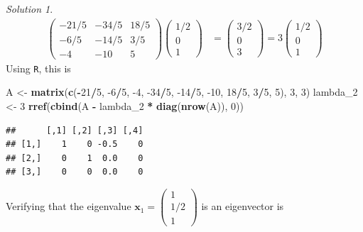 \documentclass[
]{book}
\newenvironment{Shaded}{\begin{snugshade}}{\end{snugshade}}
\newcommand{\DecValTok}[1]{\textcolor[rgb]{0.00,0.00,0.81}{#1}}
\newcommand{\KeywordTok}[1]{\textcolor[rgb]{0.13,0.29,0.53}{\textbf{#1}}}
\newcommand{\NormalTok}[1]{#1}
\newcommand{\OperatorTok}[1]{\textcolor[rgb]{0.81,0.36,0.00}{\textbf{#1}}}
\newcommand{\StringTok}[1]{\textcolor[rgb]{0.31,0.60,0.02}{#1}}
\theoremstyle{definition}
\theoremstyle{definition}
\theoremstyle{definition}
\theoremstyle{definition}
\theoremstyle{remark}
\newtheorem*{solution}{Solution}
\begin{document}
\begin{solution}
\[\begin{aligned}
\begin{pmatrix} -21/5 & -34/5 & 18/5 \\ -6/5 & -14/5 & 3/5 \\ -4 & -10 & 5 \end{pmatrix} \begin{pmatrix} 1/2 \\ 0 \\ 1 \end{pmatrix} & = \begin{pmatrix} 3/2 \\ 0 \\ 3 \end{pmatrix}  = 3 \begin{pmatrix} 1/2 \\ 0 \\ 1 \end{pmatrix}
\end{aligned}
\]
Using \texttt{R}, this is

\begin{Shaded}
\begin{Highlighting}[]
\NormalTok{A <-}\StringTok{ }\KeywordTok{matrix}\NormalTok{(}\KeywordTok{c}\NormalTok{(}\OperatorTok{-}\DecValTok{21}\OperatorTok{/}\DecValTok{5}\NormalTok{, }\DecValTok{-6}\OperatorTok{/}\DecValTok{5}\NormalTok{, }\DecValTok{-4}\NormalTok{, }\DecValTok{-34}\OperatorTok{/}\DecValTok{5}\NormalTok{, }\DecValTok{-14}\OperatorTok{/}\DecValTok{5}\NormalTok{, }\DecValTok{-10}\NormalTok{, }\DecValTok{18}\OperatorTok{/}\DecValTok{5}\NormalTok{,  }\DecValTok{3}\OperatorTok{/}\DecValTok{5}\NormalTok{, }\DecValTok{5}\NormalTok{), }\DecValTok{3}\NormalTok{, }\DecValTok{3}\NormalTok{)}
\NormalTok{lambda_}\DecValTok{2}\NormalTok{ <-}\StringTok{ }\DecValTok{3}
\KeywordTok{rref}\NormalTok{(}\KeywordTok{cbind}\NormalTok{(A }\OperatorTok{-}\StringTok{ }\NormalTok{lambda_}\DecValTok{2} \OperatorTok{*}\StringTok{ }\KeywordTok{diag}\NormalTok{(}\KeywordTok{nrow}\NormalTok{(A)), }\DecValTok{0}\NormalTok{))}
\end{Highlighting}
\end{Shaded}

\begin{verbatim}
##      [,1] [,2] [,3] [,4]
## [1,]    1    0 -0.5    0
## [2,]    0    1  0.0    0
## [3,]    0    0  0.0    0
\end{verbatim}

Verifying that the eigenvalue \(\mathbf{x}_1 = \begin{pmatrix} 1 \\ 1/2 \\ 1 \end{pmatrix}\) is an eigenvector is


\end{solution}
\end{document}
